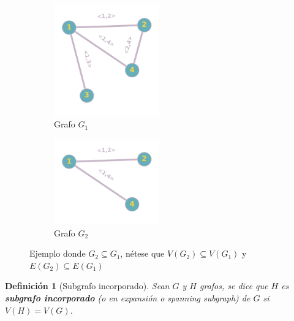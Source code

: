 \documentclass[a4paper,1pt]{report}
\newtheorem*{dfn}{Definición}
\begin{document}
\begin{figure}[H]
\centering
\begin{subfigure}[b]{0.45\textwidth}
\centering
\includegraphics[width=0.5\textwidth]{figures/grafo2.png}
\caption{Grafo $G_1$}
\end{subfigure}
\begin{subfigure}[b]{0.45\textwidth}
    \centering
\includegraphics[width=0.5\textwidth]{figures/subgrafo.png}
\caption{Grafo $G_2$}
\end{subfigure}
\caption{Ejemplo donde $G_2 \subseteq G_1$, n\'etese que $V(G_2) \subseteq V(G_1)$ y $E(G_2) \subseteq E(G_1)$}
\end{figure} 


\begin{dfn}[Subgrafo incorporado]
    Sean $G$ y $H$ grafos, se dice que $H$ es \textbf{subgrafo incorporado} (o en expansi\'on  o spanning subgraph) de $G$ si $V(H) = V(G)$.
\end{dfn}
\end{document}
